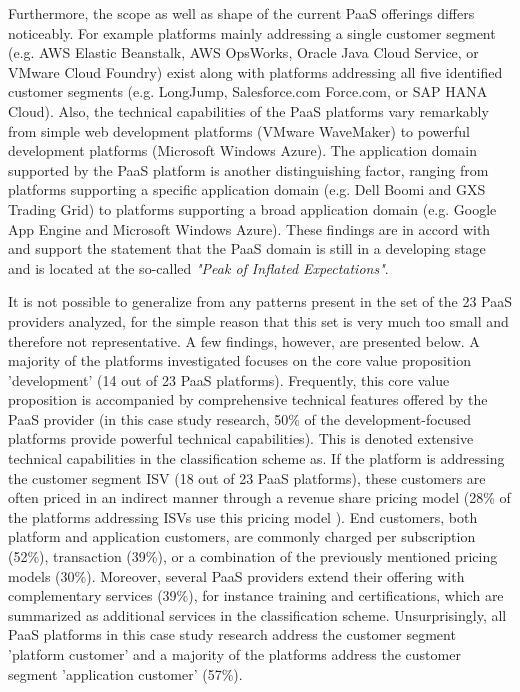 Furthermore, the scope as well as shape of the current \ac{PaaS} offerings differs noticeably. For example platforms mainly addressing a single customer segment (e.g. \ac{AWS} Elastic Beanstalk, \ac{AWS} OpsWorks, Oracle Java Cloud Service, or VMware Cloud Foundry) exist along with platforms addressing all five identified customer segments (e.g. LongJump, Salesforce.com Force.com, or SAP HANA Cloud). Also, the technical capabilities of the \ac{PaaS} platforms vary remarkably from simple web development platforms (VMware WaveMaker) to powerful development platforms (Microsoft Windows Azure). The application domain supported by the \ac{PaaS} platform is another distinguishing factor, ranging from platforms supporting a specific application domain (e.g. Dell Boomi and GXS Trading Grid) to platforms supporting a broad application domain (e.g. Google App Engine and Microsoft Windows Azure). These findings are in accord with \citep[p. 5]{Smith2012} and support the statement that the \ac{PaaS} domain is still in a developing stage and is located at the so-called \textit{"Peak of Inflated Expectations"}.

It is not possible to generalize from any patterns present in the set of the 23 \ac{PaaS} providers analyzed, for the simple reason that this set is very much too small and therefore not representative. A few findings, however, are presented below. A majority of the platforms investigated focuses on the core value proposition 'development' (14 out of 23 \ac{PaaS} platforms). Frequently, this core value proposition is accompanied by comprehensive technical features offered by the \ac{PaaS} provider (in this case study research, 50\% of the development-focused platforms provide powerful technical capabilities). This is denoted extensive technical capabilities in the classification scheme as. If the platform is addressing the customer segment \ac{ISV} (18 out of 23 \ac{PaaS} platforms), these customers are often priced in an indirect manner through a revenue share pricing model (28\% of the platforms addressing \acp{ISV} use this pricing model ). End customers, both platform and application customers, are commonly charged per subscription (52\%), transaction (39\%), or a combination of the previously mentioned pricing models (30\%). Moreover, several \ac{PaaS} providers extend their offering with complementary services (39\%), for instance training and certifications, which are summarized as additional services in the classification scheme. Unsurprisingly, all \ac{PaaS} platforms in this case study research address the customer segment 'platform customer' and a majority of the platforms address the customer segment 'application customer' (57\%).

